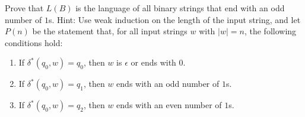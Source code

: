 \documentclass[11pt,fleqn]{article}
\newcommand{\be}{\begin{enumerate}}
\newcommand{\ee}{\end{enumerate}}
\begin{document}
   Prove that $L(B)$ is the language of all binary strings that end
   with an odd number of $1$s.  Hint: Use weak induction on the length
   of the input string, and let $P(n)$ be the statement that, for all
   input strings $w$ with $|w| = n$, the following conditions hold:

   \be

     \item If $\delta^*(q_0,w) = q_0$, then $w$ is $\epsilon$ or ends
       with $0$.

     \item If $\delta^*(q_0,w) = q_1$, then $w$ ends with an odd
       number of $1$s.

     \item If $\delta^*(q_0,w) = q_2$, then $w$ ends
       with an even number of $1$s.

   \ee
	
\end{document}

